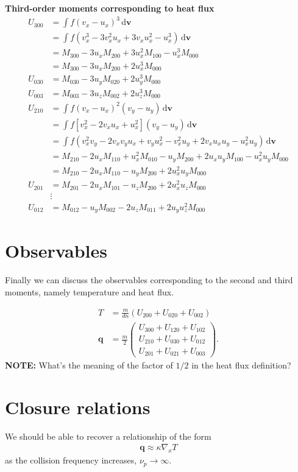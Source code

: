\documentclass{article}
\newcommand{\dv}{\,\mathrm{d} \bm{v}}
\begin{document}
\textbf{Third-order moments corresponding to heat flux}
\begin{align*}
    U_{300} &= \int f (v_x - u_x)^3 \, \mathrm{d} \bm{v} \\
            &= \int f (v_x^3 - 3 v_x^2 u_x + 3v_x u_x^2 - u_x^3) \, \mathrm{d} \bm{v} \\
            &= M_{300} - 3u_x M_{200} + 3u_x^2 M_{100} - u_x^3 M_{000} \\
            &= M_{300} - 3u_x M_{200} + 2u_x^3 M_{000} \\
    U_{030} &= M_{030} - 3u_y M_{020} + 2u_y^3 M_{000} \\
    U_{003} &= M_{003} - 3u_z M_{002} + 2u_z^3 M_{000} \\
    U_{210} &= \int f (v_x - u_x)^2 (v_y - u_y) \,\mathrm{d} \bm{v} \\
            &= \int f \left[ v_x^2 - 2v_x u_x + u_x^2 \right] (v_y - u_y) \dv \\
            &= \int f (v_x^2 v_y - 2v_x v_y u_x + v_y u_x^2 - v_x^2 u_y + 2 v_x u_x u_y - u_x^2 u_y) \dv \\
            &= M_{210} - 2u_x M_{110} + u_x^2 M_{010} - u_y M_{200} + 2 u_x u_y M_{100} - u_x^2 u_y M_{000} \\
            &= M_{210} - 2u_x M_{110} - u_y M_{200} + 2 u_x^2 u_y M_{000} \\
    U_{201} &= M_{201} - 2u_x M_{101} - u_z M_{200} + 2 u_x^2 u_z M_{000} \\
            &\vdots \\
    U_{012} &= M_{012} - u_y M_{002} - 2u_z M_{011} + 2 u_y u_z^2 M_{000}
\end{align*}

\section{Observables}

Finally we can discuss the observables corresponding to the second and third moments,
namely temperature and heat flux.

\begin{align*}
    T &= \frac{m}{d n} (U_{200} + U_{020} + U_{002}) \\
    \bm{q} &= \frac{m}{2} \begin{pmatrix}
        U_{300} + U_{120} + U_{102} \\
        U_{210} + U_{030} + U_{012} \\
        U_{201} + U_{021} + U_{003}
    \end{pmatrix}.
\end{align*}
\textbf{NOTE:} What's the meaning of the factor of $1/2$ in the heat flux definition?


\section{Closure relations}
We should be able to recover a relationship of the form
\begin{align*}
\mathbf{q} \approx \kappa \nabla_x T
\end{align*}
as the collision frequency increases, $\nu_p \rightarrow \infty$.
\end{document}
